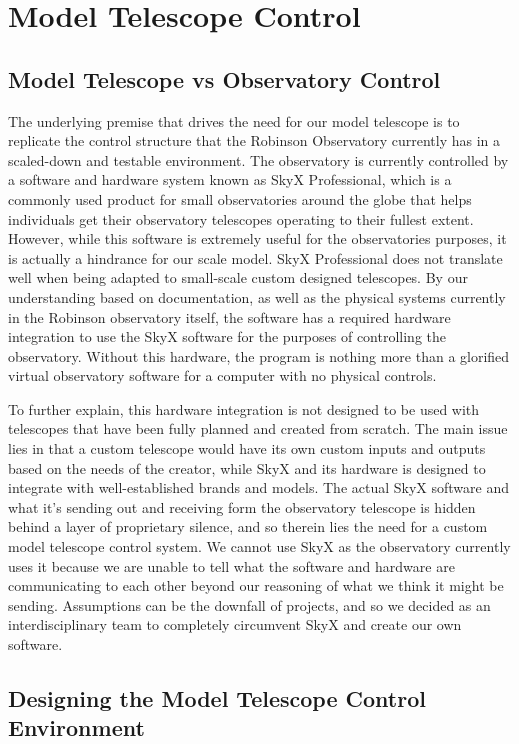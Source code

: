 \documentclass[12pt]{report}
\begin{document}
\section*{Model Telescope Control}

\subsection*{Model Telescope vs Observatory Control}

The underlying premise that drives the need for our model telescope is to replicate the control structure that the Robinson Observatory currently has in a scaled-down and testable environment. The observatory is currently controlled by a software and hardware system known as SkyX Professional, which is a commonly used product for small observatories around the globe that helps individuals get their observatory telescopes operating to their fullest extent. However, while this software is extremely useful for the observatories purposes, it is actually a hindrance for our scale model. SkyX Professional does not translate well when being adapted to small-scale custom designed telescopes. By our understanding based on documentation, as well as the physical systems currently in the Robinson observatory itself, the software has a required hardware integration to use the SkyX software for the purposes of controlling the observatory. Without this hardware, the program is nothing more than a glorified virtual observatory software for a computer with no physical controls.

To further explain, this hardware integration is not designed to be used with telescopes that have been fully planned and created from scratch. The main issue lies in that a custom telescope would have its own custom inputs and outputs based on the needs of the creator, while SkyX and its hardware is designed to integrate with well-established brands and models. The actual SkyX software and what it’s sending out and receiving form the observatory telescope is hidden behind a layer of proprietary silence, and so therein lies the need for a custom model telescope control system. We cannot use SkyX as the observatory currently uses it because we are unable to tell what the software and hardware are communicating to each other beyond our reasoning of what we think it might be sending. Assumptions can be the downfall of projects, and so we decided as an interdisciplinary team to completely circumvent SkyX and create our own software. 

\subsection*{Designing the Model Telescope Control Environment}
\end{document}
